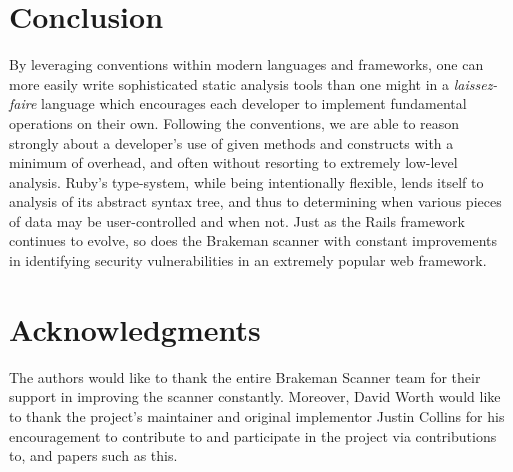 \documentclass[conference]{IEEEtran}
\begin{document}
\section{Conclusion}

By leveraging conventions within modern languages and frameworks, one can more easily write
sophisticated static analysis tools than one might in a \emph{laissez-faire} language which
encourages each developer to implement fundamental operations on their own.  Following the
conventions, we are able to reason strongly about a developer's use of given methods and
constructs with a minimum of overhead, and often without resorting to extremely low-level
analysis.  Ruby's type-system, while being intentionally flexible, lends itself to analysis
of its abstract syntax tree, and thus to determining when various pieces of data may be
user-controlled and when not.  Just as the Rails framework continues to evolve, so does
the Brakeman scanner with constant improvements in identifying security vulnerabilities in
an extremely popular web framework.

\section*{Acknowledgments}

The authors would like to thank the entire Brakeman Scanner team for their support in
improving the scanner constantly.  Moreover, David Worth would like to thank the project's
maintainer and original implementor Justin Collins for his encouragement to contribute to
and participate in the project via contributions to, and papers such as this.




%
%
%
%
%
\end{document}
